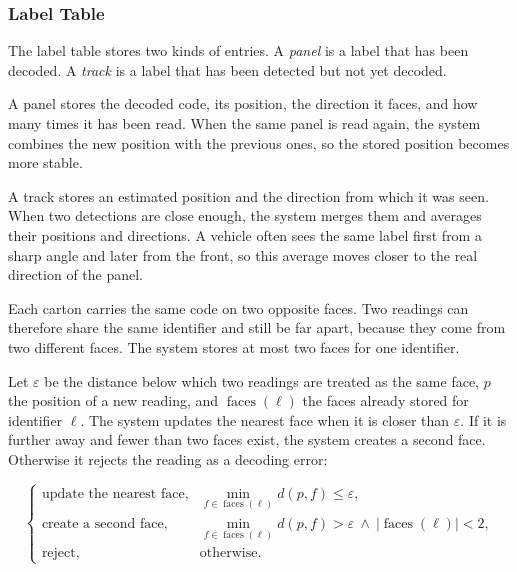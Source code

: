 \FloatBarrier

\subsubsection*{Label Table}

The label table stores two kinds of entries. A \emph{panel} is a label that has
been decoded. A \emph{track} is a label that has been detected but not yet
decoded.

A panel stores the decoded code, its position, the direction it faces, and how
many times it has been read. When the same panel is read again, the system
combines the new position with the previous ones, so the stored position becomes
more stable.

A track stores an estimated position and the direction from which it was seen.
When two detections are close enough, the system merges them and averages their
positions and directions. A vehicle often sees the same label first from a sharp
angle and later from the front, so this average moves closer to the real
direction of the panel.

Each carton carries the same code on two opposite faces. Two readings can
therefore share the same identifier and still be far apart, because they come
from two different faces. The system stores at most two faces for one identifier.

Let $\varepsilon$ be the distance below which two readings are treated as the
same face, $p$ the position of a new reading, and $\operatorname{faces}(\ell)$
the faces already stored for identifier $\ell$. The system updates the nearest
face when it is closer than $\varepsilon$. If it is further away and fewer than
two faces exist, the system creates a second face. Otherwise it rejects the
reading as a decoding error:

\begin{equation}
    \begin{cases}
        \text{update the nearest face}, &
        \min\limits_{f\in\operatorname{faces}(\ell)} d(p,f)\leq\varepsilon,                \\[6pt]
        \text{create a second face},    &
        \min\limits_{f\in\operatorname{faces}(\ell)} d(p,f)>\varepsilon
        \ \land\ \lvert\operatorname{faces}(\ell)\rvert<2,                                 \\[4pt]
        \text{reject},                  & \text{otherwise}.
    \end{cases}
    \label{eq:sys:faces}
\end{equation}

